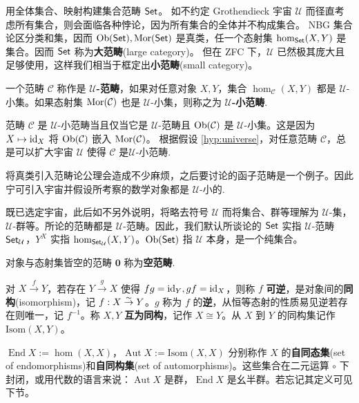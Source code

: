 用全体集合、映射构建集合范畴 $\mathsf{Set}$。
如不约定 Grothendieck 宇宙 $\mathcal{U}$ 而径直考虑所有集合，则会面临各种悖论，因为所有集合的全体并不构成集合。
NBG 集合论区分类和集，因而 $\operatorname{Ob}(\mathsf{Set}),\operatorname{Mor}(\mathsf{Set})$ 是真类，任一个态射集 $\hom_{\mathsf{Set}}(X,Y)$ 是集合。因而 $\mathsf{Set}$ 称为\textbf{大范畴}(large category)。
但在 ZFC 下，$\mathcal U$ 已然极其庞大且足够使用，这样我们相当于框定出\textbf{小范畴}(small category)。
\begin{definition}\label{def:U-cat}
  一个范畴 $\mathcal{C}$ 称作是 \textbf{$\mathcal{U}$-范畴}，如果对任意对象 $X, Y$，集合 $\hom_{\mathcal{C}}(X,Y)$ 都是 $\mathcal{U}$-小集。如果态射集 $\operatorname{Mor}(\mathcal{C})$ 也是 $\mathcal{U}$-小集，则称之为 \textbf{$\mathcal{U}$-小范畴}.
\end{definition}
\begin{remark}
	范畴 $\mathcal{C}$ 是 $\mathcal{U}$-小范畴当且仅当它是 $\mathcal{U}$-范畴且 $\operatorname{Ob}(\mathcal{C})$ 是 $\mathcal{U}$-小集。这是因为 $X \mapsto \mathrm{id}_X$ 将 $\operatorname{Ob}(\mathcal{C})$ 嵌入 $\operatorname{Mor}(\mathcal{C})$。
根据假设 \ref{hyp:universe}，对任意范畴 $\mathcal{C}$，总是可以扩大宇宙 $\mathcal{U}$ 使得 $\mathcal{C}$ 是$\mathcal{U}$-小范畴.
\end{remark}
将真类引入范畴论公理会造成不少麻烦，之后要讨论的函子范畴是一个例子。因此宁可引入宇宙并假设所考察的数学对象都是 $\mathcal{U}$-小的.

既已选定宇宙，此后如不另外说明，将略去符号 $\mathcal{U}$ 而将集合、群等理解为 $\mathcal{U}$-集，$\mathcal{U}$-群等。所论的范畴都是 $\mathcal{U}$-范畴。因此，我们默认所谈论的 $\mathsf{Set}$ 实指 $\mathcal{U}$-范畴 $\mathsf{Set}_\mathcal{U}$，$Y^X$ 实指 $\hom_{\mathsf{Set}_\mathcal{U}}(X,Y)$。$\operatorname{Ob}(\mathsf{Set})$ 指 $\mathcal{U}$ 本身，是一个纯集合。

\begin{definition}
	对象与态射集皆空的范畴 $\mathbf{0}$ 称为\textbf{空范畴}.
\end{definition}

\begin{definition}
    对 $X \xrightarrow{f} Y$，若存在 $Y \xrightarrow{g} X$ 使得 $f g = \mathrm{id}_Y,g f = \mathrm{id}_X$，则称 $f$ \textbf{可逆}，是对象间的\textbf{同构}(isomorphism)，记 $f: X \stackrel{\sim}{\rightarrow} Y$。$g$ 称为 $f$ 的\textbf{逆}，从恒等态射的性质易见逆若存在则唯一，记 $f^{-1}$。称 $X,Y$ \textbf{互为同构}，记作 $X\cong Y$。从 $X$ 到 $Y$ 的同构集记作 $\mathrm{Isom}(X, Y)$。

    $\operatorname{End} X := \hom(X, X)$，$\operatorname{Aut} X := \mathrm{Isom}(X, X)$ 分别称作 $X$ 的\textbf{自同态集}(set of endomorphisms)和\textbf{自同构集}(set of automorphisms)。这些集合在二元运算 $\circ$ 下封闭，或用代数的语言来说：$\operatorname{Aut} X$ 是群，$\operatorname{End} X$ 是幺半群。若忘记其定义可见下节。
\end{definition}

